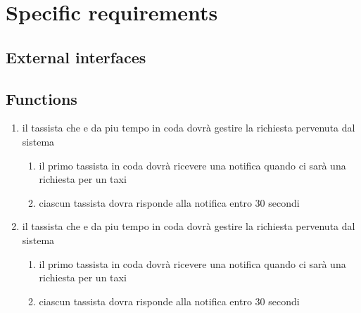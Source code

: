 \section{Specific requirements}

\subsection{External interfaces}


\subsection{Functions}
\begin{enumerate}
\item il tassista che e da piu tempo in coda dovrà gestire la richiesta pervenuta dal sistema
	\begin{enumerate}
	\item il primo tassista in coda dovrà ricevere una notifica quando ci sarà una richiesta per un taxi
	\item ciascun tassista dovra risponde alla notifica entro 30 secondi
	\end{enumerate}

\item il tassista che e da piu tempo in coda dovrà gestire la richiesta pervenuta dal sistema
	\begin{enumerate}
	\item il primo tassista in coda dovrà ricevere una notifica quando ci sarà una richiesta per un taxi
	\item ciascun tassista dovra risponde alla notifica entro 30 secondi
	\end{enumerate}
	
\end{enumerate}
%
